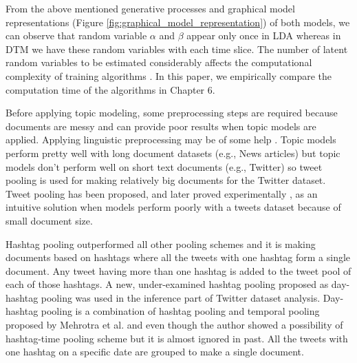 \documentclass[a4paper]{report}
\begin{document}
From the above mentioned generative processes and graphical model representations (Figure \ref{fig:graphical_model_representation}) of both models, we can observe that random variable $\alpha$ and $\beta$ appear only once in LDA whereas in DTM we have these random variables with each time slice.
The number of latent random variables to be estimated considerably affects the computational complexity of training algorithms \cite{li2014reducing, yao2009efficient}. In this paper, we empirically compare the computation time of the algorithms in Chapter 6.

Before applying topic modeling, some preprocessing steps are required because documents are messy and can provide poor results when topic models are applied. Applying linguistic preprocessing may be of some help \cite{han2012automatically}. Topic models perform pretty well with long document datasets (e.g., News articles) but topic models don't perform well on short text documents (e.g., Twitter) so tweet pooling is used for making relatively big documents for the Twitter dataset. Tweet pooling has been proposed, and later proved experimentally \cite{mehrotra2013improving}, as an intuitive solution \cite{hong2010empirical,zhao2011comparing} when models perform poorly with a tweets dataset because of small document size.

Hashtag pooling outperformed all other pooling schemes \cite{mehrotra2013improving} and it is making documents based on hashtags where all the tweets with one hashtag form a single document. Any tweet having more than one hashtag is added to the tweet pool of each of those hashtags. A new, under-examined hashtag pooling proposed as day-hashtag pooling was used in the inference part of Twitter dataset analysis.
Day-hashtag pooling is a combination of hashtag pooling and temporal pooling proposed by Mehrotra et al. \cite{mehrotra2013improving} and even though the author showed a possibility of hashtag-time pooling scheme but it is almost ignored in past. All the tweets with one hashtag on a specific date are grouped to make a single document.

\end{document}
